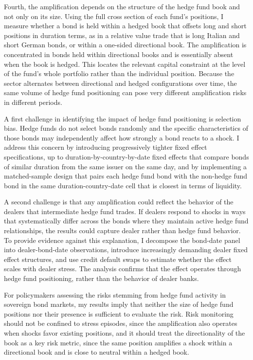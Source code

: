 \documentclass[english, 11pt, oneside]{article}
\begin{document}
Fourth, the amplification depends on the structure of the hedge fund book and not only on its size. Using the full cross section of each fund's positions, I measure whether a bond is held within a hedged book that offsets long and short positions in duration terms, as in a relative value trade that is long Italian and short German bonds, or within a one-sided directional book. The amplification is concentrated in bonds held within directional books and is essentially absent when the book is hedged. This locates the relevant capital constraint at the level of the fund's whole portfolio rather than the individual position. Because the sector alternates between directional and hedged configurations over time, the same volume of hedge fund positioning can pose very different amplification risks in different periods.

A first challenge in identifying the impact of hedge fund positioning is selection bias. Hedge funds do not select bonds randomly and the specific characteristics of those bonds may independently affect how strongly a bond reacts to a shock. I address this concern by introducing progressively tighter fixed effect specifications, up to duration-by-country-by-date fixed effects that compare bonds of similar duration from the same issuer on the same day, and by implementing a matched-sample design that pairs each hedge fund bond with the non-hedge fund bond in the same duration-country-date cell that is closest in terms of liquidity.

A second challenge is that any amplification could reflect the behavior of the dealers that intermediate hedge fund trades. If dealers respond to shocks in ways that systematically differ across the bonds where they maintain active hedge fund relationships, the results could capture dealer rather than hedge fund behavior. To provide evidence against this explanation, I decompose the bond-date panel into dealer-bond-date observations, introduce increasingly demanding dealer fixed effect structures, and use credit default swaps to estimate whether the effect scales with dealer stress. The analysis confirms that the effect operates through hedge fund positioning, rather than the behavior of dealer banks.

For policymakers assessing the risks stemming from hedge fund activity in sovereign bond markets, my results imply that neither the size of hedge fund positions nor their presence is sufficient to evaluate the risk. Risk monitoring should not be confined to stress episodes, since the amplification also operates when shocks favor existing positions, and it should treat the directionality of the book as a key risk metric, since the same position amplifies a shock within a directional book and is close to neutral within a hedged book.
\end{document}
